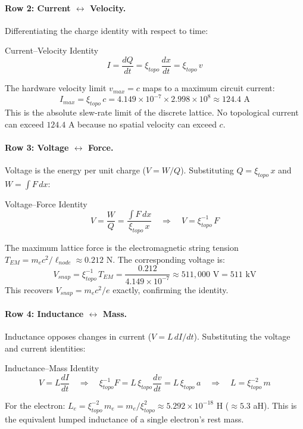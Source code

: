 \paragraph{Row 2: Current $\leftrightarrow$ Velocity.}
Differentiating the charge identity with respect to time:
\begin{resultbox}{Current--Velocity Identity}
\begin{equation}
    I = \frac{dQ}{dt} = \xi_{topo}\, \frac{dx}{dt} = \xi_{topo}\, v
    \label{eq:current_velocity}
\end{equation}
\end{resultbox}
\noindent The hardware velocity limit $v_{max} = c$ maps to a maximum circuit current:
\begin{equation}
    I_{max} = \xi_{topo}\, c = 4.149 \times 10^{-7} \times 2.998 \times 10^{8} \approx 124.4 \text{ A}
\end{equation}
This is the absolute slew-rate limit of the discrete lattice. No topological current can exceed $124.4$ A because no spatial velocity can exceed $c$.

\paragraph{Row 3: Voltage $\leftrightarrow$ Force.}
Voltage is the energy per unit charge ($V = W/Q$). Substituting $Q = \xi_{topo}\, x$ and $W = \int F\, dx$:
\begin{resultbox}{Voltage--Force Identity}
\begin{equation}
    V = \frac{W}{Q} = \frac{\int F\, dx}{\xi_{topo}\, x} \quad \Longrightarrow \quad V = \xi_{topo}^{-1}\, F
    \label{eq:voltage_force}
\end{equation}
\end{resultbox}
\noindent The maximum lattice force is the electromagnetic string tension $T_{EM} = m_e c^2 / \ell_{node} \approx 0.212$ N. The corresponding voltage is:
\begin{equation}
    V_{snap} = \xi_{topo}^{-1}\, T_{EM} = \frac{0.212}{4.149 \times 10^{-7}} \approx 511{,}000 \text{ V} = 511 \text{ kV}
\end{equation}
This recovers $V_{snap} = m_e c^2 / e$ exactly, confirming the identity.

\paragraph{Row 4: Inductance $\leftrightarrow$ Mass.}
Inductance opposes changes in current ($V = L\, dI/dt$). Substituting the voltage and current identities:
\begin{resultbox}{Inductance--Mass Identity}
\begin{equation}
    V = L \frac{dI}{dt} \quad \Longrightarrow \quad \xi_{topo}^{-1} F = L\, \xi_{topo} \frac{dv}{dt} = L\, \xi_{topo}\, a
    \quad \Longrightarrow \quad L = \xi_{topo}^{-2}\, m
    \label{eq:inductance_mass}
\end{equation}
\end{resultbox}
\noindent For the electron: $L_e = \xi_{topo}^{-2}\, m_e = m_e / \xi_{topo}^{2} \approx 5.292 \times 10^{-18}$ H ($\approx 5.3$ aH). This is the equivalent lumped inductance of a single electron's rest mass.

